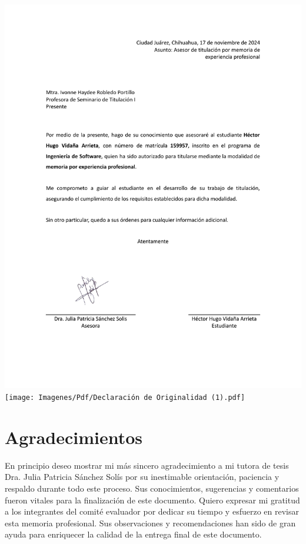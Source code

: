 \documentclass[final, fmstyle, 12pt]{article}
\begin{document}
\newpage
\begin{center}

\includegraphics[scale=0.8]{Imagenes/Pdf/Carta asesor.pdf}
\texttt{[image: Imagenes/Pdf/Declaración de Originalidad (1).pdf]}

\end{center}


\newpage
\section*{Agradecimientos}
\setlength{\parskip}{1em}
En principio deseo mostrar mi más sincero agradecimiento a mi tutora de tesis Dra. Julia Patricia Sánchez Solís por su inestimable orientación, paciencia y respaldo durante todo este proceso. Sus conocimientos, sugerencias y comentarios fueron vitales para la finalización de este documento.
Quiero expresar mi gratitud a los integrantes del comité evaluador por dedicar su tiempo y esfuerzo en revisar esta memoria profesional. Sus observaciones y recomendaciones han sido de gran ayuda para enriquecer la calidad de la entrega final de este documento.
\end{document}
